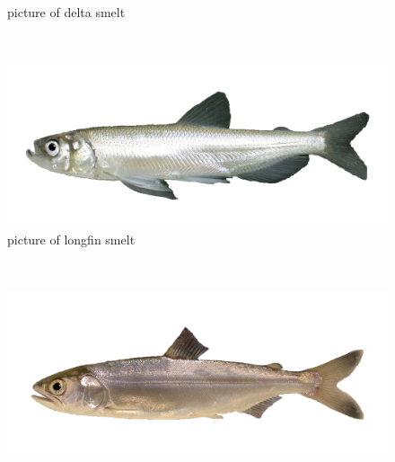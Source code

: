 \documentclass[
]{book}
\begin{document}
\begin{panel-grid}
\begin{columns-nocenter}
\begin{column800}
\begin{figure}
{}

\caption{picture of delta smelt}\label{fig:unnamed-chunk-40}
\end{figure}

\end{column800}

\begin{column40}

~

\end{column40}

\begin{column800}

\begin{figure}

{\centering \includegraphics[width=29.17in]{figures/longfin_smelt_adult} 

}

\caption{picture of longfin smelt}\label{fig:unnamed-chunk-41}
\end{figure}

\end{column800}

\begin{column40}

~

\end{column40}

\begin{column800}

\begin{figure}

{\centering \includegraphics[width=29.17in]{figures/chinook_salmon_smolt} 

}
\end{figure}
\end{column800}
\end{columns-nocenter}
\end{panel-grid}
\end{document}
